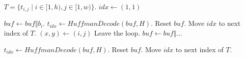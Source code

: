 \begin{algorithm}
	\caption{Data Extraction}
	
	\begin{algorithmic}[1]

		\State $T = \{t_{i, j} \mid i \in [1, h), j \in [1, w)\}$.
		\State $idx \gets (1, 1)$
		
		\State $buf \gets buf \Vert b_i$.
		\State $t_{idx} \gets HuffmanDecode(buf, H)$.
		\State Reset $buf$.
		\State Move $idx$ to next index of $T$.
		\EndIf
		\EndFor
		\ForAll{$\{t_{i, j} \mid t_{i, j} \in T, i \in [1, h), j \in [1, w)\}$}
		\State $(x, y) \gets (i, j)$
		\State Leave the loop.
		\EndIf
		\State $buf \gets buf \Vert ...$
		
		\State $t_{idx} \gets HuffmanDecode(buf, H)$.
		\State Reset $buf$.
		\State Move $idx$ to next index of $T$.
		\EndIf
		\EndFor
		
		
	\end{algorithmic}
\end{algorithm}

